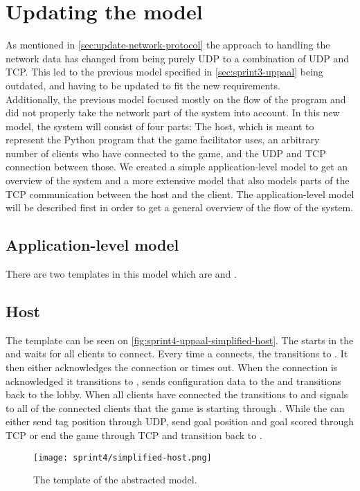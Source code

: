 \section{Updating the \uppaal model}
As mentioned in \autoref{sec:update-network-protocol} the approach to handling the network data has changed from being purely UDP to a combination of UDP and TCP.
This led to the previous \uppaal model specified in \autoref{sec:sprint3-uppaal} being outdated, and having to be updated to fit the new requirements.
\\
Additionally, the previous model focused mostly on the flow of the program and did not properly take the network part of the system into account.
In this new model, the system will consist of four parts: The host, which is meant to represent the Python program that the game facilitator uses, an arbitrary number of clients who have connected to the game, and the UDP and TCP connection between those.
We created a simple application-level model to get an overview of the system and a more extensive model that also models parts of the TCP communication between the host and the client.
The application-level model will be described first in order to get a general overview of the flow of the system.

\subsection{Application-level \uppaal model}
There are two templates in this model which are  and .

\subsection*{Host}
The  template can be seen on \autoref{fig:sprint4-uppaal-simplified-host}. 
The  starts in the  and waits for all clients to connect.
Every time a  connects, the  transitions to .
It then either acknowledges the connection or times out.
When the connection is acknowledged it transitions to , sends configuration data to the  and transitions back to the lobby.
When all clients have connected the  transitions to  and signals to all of the connected clients that the game is starting through .
While  the  can either send tag position through UDP, send goal position and goal scored through TCP or end the game through TCP and transition back to .
\begin{figure}[h]
    \centering
    \texttt{[image: sprint4/simplified-host.png]}
    \caption{The  template of the abstracted \uppaal model.}
    \label{fig:sprint4-uppaal-simplified-host}
\end{figure}

